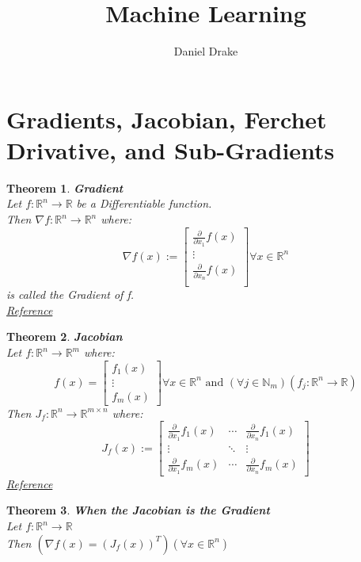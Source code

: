 \documentclass[12pt]{extarticle}
\title{Machine Learning}
\author{Daniel Drake}
\theoremstyle{plain}
\newtheorem{thm}{Theorem}[section]
\theoremstyle{Definition}
\theoremstyle{Definition}
\theoremstyle{plain}
\begin{document}
		\maketitle			
\section{Gradients, Jacobian, Ferchet Drivative, and Sub-Gradients} 
\begin{thm} \textbf{Gradient} \\ 
	Let $f : \mathbb{R}^n \to \mathbb{R}$ be a Differentiable function. \\ 
	Then $\nabla f: \mathbb{R}^n \to \mathbb{R}^n$ where: \\ 
	\[
	\nabla f(x) := 
	\begin{bmatrix}
	\frac{\partial }{\partial x_1}f(x) \\ 
	\vdots \\
	\frac{\partial }{\partial x_n}f(x) \\ 				
	\end{bmatrix}
	\forall x \in \mathbb{R}^n
	\]
	is called the Gradient of f. \\
	\href{https://en.wikipedia.org/wiki/Gradient}{Reference}
\end{thm}

\begin{thm} \textbf{Jacobian} \\ 
	Let $f : \mathbb{R}^n \to \mathbb{R}^m$ where: 
	\[
	f(x) = 
	\begin{bmatrix}
	f_1(x) \\ 
	\vdots \\ 
	f_m(x) 
	\end{bmatrix}
	\forall x \in \mathbb{R}^n \text{ and } (\forall j \in \mathbb{N}_m) (f_j : \mathbb{R}^n \to \mathbb{R}) 
	\]
	Then $J_f : \mathbb{R}^n \to \mathbb{R}^{m \times n}$ where: \\  
	\[
	J_f(x) := 
	\begin{bmatrix} 
	\frac{\partial }{\partial x_1}f_1(x) & \cdots & \frac{\partial }{\partial x_n}f_1(x) \\
	\vdots & \ddots & \vdots \\ 
	\frac{\partial }{\partial x_1}f_m(x) & \cdots & \frac{\partial }{\partial x_n}f_m(x) 
	\end{bmatrix}
	\]
	\href{https://en.wikipedia.org/wiki/Jacobian_matrix_and_determinant}{Reference}
\end{thm}

\begin{thm} \textbf{When the Jacobian is the Gradient} \\
	Let $f : \mathbb{R}^n \to \mathbb{R}$ \\ 
	Then $(\nabla f(x) = (J_f(x))^T) (\forall x \in \mathbb{R}^n)$ \\ 	
\end{thm}
\end{document}

